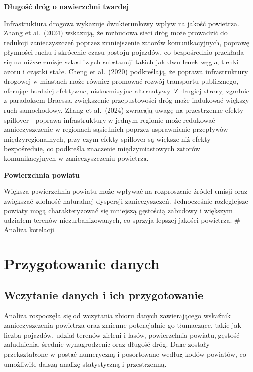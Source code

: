 \documentclass[
  11pt,
]{article}
\begin{document}
\textbf{Długość dróg o nawierzchni twardej}

Infrastruktura drogowa wykazuje dwukierunkowy wpływ na jakość powietrza.
Zhang et al.~(2024) wskazują, że rozbudowa sieci dróg może prowadzić do
redukcji zanieczyszczeń poprzez zmniejszenie zatorów komunikacyjnych,
poprawę płynności ruchu i skrócenie czasu postoju pojazdów, co
bezpośrednio przekłada się na niższe emisje szkodliwych substancji
takich jak dwutlenek węgla, tlenki azotu i cząstki stałe. Cheng et
al.~(2020) podkreślają, że poprawa infrastruktury drogowej w miastach
może również promować rozwój transportu publicznego, oferując bardziej
efektywne, niskoemisyjne alternatywy. Z drugiej strony, zgodnie z
paradoksem Braessa, zwiększenie przepustowości dróg może indukować
większy ruch samochodowy. Zhang et al.~(2024) zwracają uwagę na
przestrzenne efekty spillover - poprawa infrastruktury w jednym regionie
może redukować zanieczyszczenie w regionach sąsiednich poprzez
usprawnienie przepływów międzyregionalnych, przy czym efekty spillover
są większe niż efekty bezpośrednie, co podkreśla znaczenie
międzymiastowych zatorów komunikacyjnych w zanieczyszczeniu powietrza.

\textbf{Powierzchnia powiatu}

Większa powierzchnia powiatu może wpływać na rozproszenie źródeł emisji
oraz zwiększać zdolność naturalnej dyspersji zanieczyszczeń.
Jednocześnie rozleglejsze powiaty mogą charakteryzować się mniejszą
gęstością zabudowy i większym udziałem terenów niezurbanizowanych, co
sprzyja lepszej jakości powietrza. \# Analiza korelacji

\section{Przygotowanie danych}\label{przygotowanie-danych}

\subsection{Wczytanie danych i ich
przygotowanie}\label{wczytanie-danych-i-ich-przygotowanie}

Analiza rozpoczęła się od wczytania zbioru danych zawierającego wskaźnik
zanieczyszczenia powietrza oraz zmienne potencjalnie go tłumaczące,
takie jak liczba pojazdów, udział terenów zieleni i lasów, powierzchnia
powiatu, gęstość zaludnienia, średnie wynagrodzenie oraz długość dróg.
Dane zostały przekształcone w postać numeryczną i posortowane według
kodów powiatów, co umożliwiło dalszą analizę statystyczną i
przestrzenną.
\end{document}
